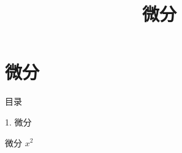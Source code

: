 \documentclass[aspectratio=169,10pt,fontset=fandol]{ctexbeamer}
\title{微分}
\begin{document}
\section{微分}
\begin{frame}[t,fragile]{目录}
\normalsize
{\color{blue}\normalsize 1. 微分\par}\vspace{0.22em}
\end{frame}
\begin{frame}[t,fragile]{微分}
\normalsize
{\normalsize
$x^2$
}
\end{frame}
\end{document}
